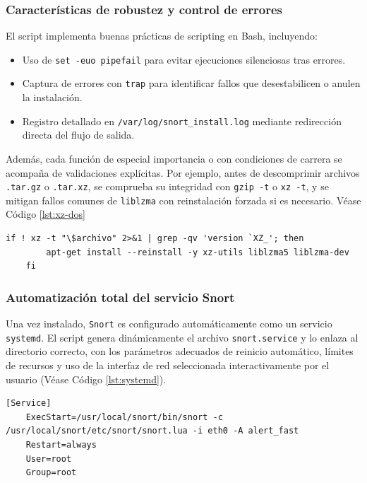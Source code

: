 \documentclass[11pt,a4paper,twoside]{report}
\begin{document}
\subsubsection{Características de robustez y control de errores}

El script implementa buenas prácticas de scripting en Bash, incluyendo:

\begin{itemize}
	\item Uso de \texttt{set -euo pipefail} para evitar ejecuciones silenciosas tras errores.
	\item Captura de errores con \texttt{trap} para identificar fallos que desestabilicen o anulen la instalación.
	\item Registro detallado en \texttt{/var/log/snort\_install.log} mediante redirección directa del flujo de salida.
\end{itemize}

Además, cada función de especial importancia o con condiciones de carrera se acompaña de validaciones explícitas. Por ejemplo, antes de descomprimir archivos \texttt{.tar.gz} o \texttt{.tar.xz}, se comprueba su integridad con \texttt{gzip -t} o \texttt{xz -t}, y se mitigan fallos comunes de \texttt{liblzma} con reinstalación forzada si es necesario. Véase Código \ref{lst:xz-dos}

\begin{lstlisting}[style=commandstyle, caption={Validación e instalación segura de paquetes xz.}, label=lst:xz-dos]
	if ! xz -t "\$archivo" 2>&1 | grep -qv 'version `XZ_'; then
		apt-get install --reinstall -y xz-utils liblzma5 liblzma-dev
	fi
\end{lstlisting}

\subsubsection{Automatización total del servicio Snort}

Una vez instalado, \texttt{Snort} es configurado automáticamente como un servicio \texttt{systemd}. El script genera dinámicamente el archivo \texttt{snort.service} y lo enlaza al directorio correcto, con los parámetros adecuados de reinicio automático, límites de recursos y uso de la interfaz de red seleccionada interactivamente por el usuario (Véase Código \ref{lst:systemd}).

\begin{lstlisting}[style=commandstyle, caption={Sección relevante del systemd generado.}, label=lst:systemd]
	[Service]
	ExecStart=/usr/local/snort/bin/snort -c /usr/local/snort/etc/snort/snort.lua -i eth0 -A alert_fast
	Restart=always
	User=root
	Group=root
\end{lstlisting}
\end{document}
